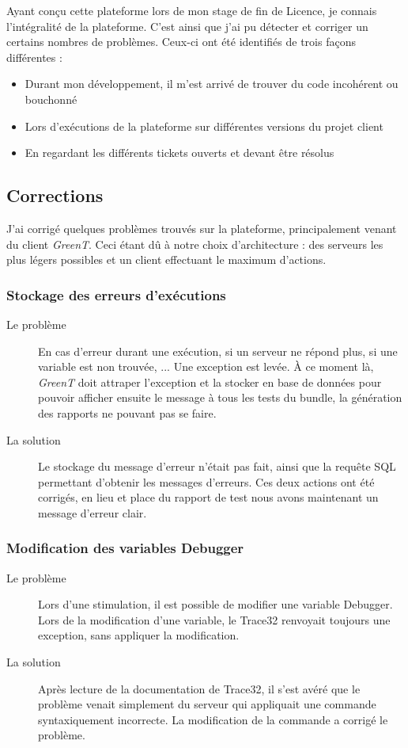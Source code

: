 Ayant conçu cette plateforme lors de mon stage de fin de Licence, je connais l'intégralité de la plateforme. C'est ainsi que j'ai pu détecter et corriger un certains nombres de problèmes. Ceux-ci ont été identifiés de trois façons différentes : 
\begin{itemize}
	\item Durant mon développement, il m'est arrivé de trouver du code incohérent ou bouchonné
	\item Lors d'exécutions de la plateforme sur différentes versions du projet client
	\item En regardant les différents tickets ouverts et devant être résolus
\end{itemize}

\subsection{Corrections}
J'ai corrigé quelques problèmes trouvés sur la plateforme, principalement venant du client \textit{GreenT}. Ceci étant dû à notre choix d'architecture : des serveurs les plus légers possibles et un client effectuant le maximum d'actions.
	\subsubsection{Stockage des erreurs d'exécutions}
	\begin{description}
		\item[Le problème] En cas d'erreur durant une exécution, si un serveur ne répond plus, si une variable est non trouvée, ... Une exception est levée. À ce moment là, \textit{GreenT} doit attraper l'exception et la stocker en base de données pour pouvoir afficher ensuite le message à tous les tests du bundle, la génération des rapports ne pouvant pas se faire.
		\item[La solution] Le stockage du message d'erreur n'était pas fait, ainsi que la requête SQL permettant d'obtenir les messages d'erreurs. Ces deux actions ont été corrigés, en lieu et place du rapport de test nous avons maintenant un message d'erreur clair.
		\end{description}
		
	\subsubsection{Modification des variables Debugger}
		\begin{description}
			\item[Le problème] Lors d'une stimulation, il est possible de modifier une variable Debugger. Lors de la modification d'une variable, le Trace32 renvoyait toujours une exception, sans appliquer la modification.
			\item[La solution] Après lecture de la documentation de Trace32, il s'est avéré que le problème venait simplement du serveur qui appliquait une commande syntaxiquement incorrecte. La modification de la commande a corrigé le problème.
	\end{description}
	
